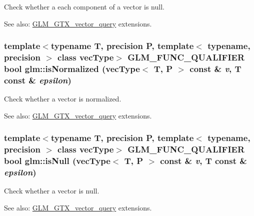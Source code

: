 Check whether a each component of a vector is null. \begin{Desc}
\item[See also:]\hyperlink{group__gtx__vector__query}{GLM\_\-GTX\_\-vector\_\-query} extensions. \end{Desc}
\hypertarget{group__gtx__vector__query_g70f64c6df21ad40303809d76b1474fbe}{
\subsubsection[isNormalized]{\setlength{\rightskip}{0pt plus 5cm}template$<$typename T, precision P, template$<$ typename, precision $>$ class vecType$>$ GLM\_\-FUNC\_\-QUALIFIER bool glm::isNormalized (vecType$<$ T, P $>$ const \& {\em v}, \/  T const \& {\em epsilon})}}
\label{group__gtx__vector__query_g70f64c6df21ad40303809d76b1474fbe}


Check whether a vector is normalized. \begin{Desc}
\item[See also:]\hyperlink{group__gtx__vector__query}{GLM\_\-GTX\_\-vector\_\-query} extensions. \end{Desc}
\hypertarget{group__gtx__vector__query_g368e458df5a70d885f5d8a87ec7b8ef8}{
\subsubsection[isNull]{\setlength{\rightskip}{0pt plus 5cm}template$<$typename T, precision P, template$<$ typename, precision $>$ class vecType$>$ GLM\_\-FUNC\_\-QUALIFIER bool glm::isNull (vecType$<$ T, P $>$ const \& {\em v}, \/  T const \& {\em epsilon})}}
\label{group__gtx__vector__query_g368e458df5a70d885f5d8a87ec7b8ef8}


Check whether a vector is null. \begin{Desc}
\item[See also:]\hyperlink{group__gtx__vector__query}{GLM\_\-GTX\_\-vector\_\-query} extensions. \end{Desc}
